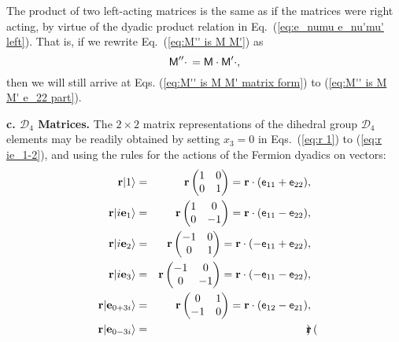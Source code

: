 \documentclass[11pt,twocolumn]{article}
\begin{document}
The product of two left-acting matrices is the same as if the matrices were right acting, by virtue of the dyadic product relation in Eq.~(\ref{eq:e_numu e_nu'mu' left}).  That is, if we rewrite Eq.~(\ref{eq:M'' is M M'}) as
\begin{equation}
\label{eq:M'' is M M' left}
\textsf M''\cdot\,=\textsf M\cdot\textsf M'\cdot, 
\end{equation}
then we will still arrive at Eqs. (\ref{eq:M'' is M M' matrix form}) to (\ref{eq:M'' is M M' e_22 part}).

\textbf{c.  $\mathcal D_4$ Matrices.}  The $2\times 2$ matrix representations of the dihedral group $\mathcal D_4$ elements may be readily obtained by setting $x_3=0$ in Eqs.~(\ref{eq:r 1}) to (\ref{eq:r ie_1-2}), and using the rules for the actions of the Fermion dyadics on vectors:
\begin{eqnarray}
\label{eq:r 1 matrix}
\mathbf r|1\rangle&=&\mathbf r
\begin{pmatrix}
1&0\\
0&1
\end{pmatrix}
=\mathbf r\cdot(\textsf e_{11}+\textsf e_{22}),\\
\label{eq:r ie_1 matrix}
\mathbf r|i\mathbf e_1\rangle&=&\mathbf r
\begin{pmatrix}
1&0\\
0&-1
\end{pmatrix}
=\mathbf r\cdot(\textsf e_{11}-\textsf e_{22}),\\
\label{eq:r ie_2 matrix}
\mathbf r|i\mathbf e_2\rangle&=&\mathbf r
\begin{pmatrix}
-1&0\\
0&1
\end{pmatrix}
=\mathbf r\cdot(-\textsf e_{11}+\textsf e_{22}),\\
\label{eq:r ie_3 matrix}
\mathbf r|i\mathbf e_3\rangle&=&\mathbf r
\begin{pmatrix}
-1&0\\
0&-1
\end{pmatrix}
=\mathbf r\cdot(-\textsf e_{11}-\textsf e_{22}),\\
\label{eq:r e_0+3i matrix}
\mathbf r|\mathbf e_{0+3i}\rangle&=&\mathbf r
\begin{pmatrix}
0&1\\
-1&0
\end{pmatrix}
=\mathbf r\cdot(\textsf e_{12}-\textsf e_{21}),\\
\label{eq:r e_0-3i matrix}
\mathbf r|\mathbf e_{0-3i}\rangle&=&\mathbf r
\begin{pmatrix}

\end{pmatrix}
\end{eqnarray}
\end{document}

